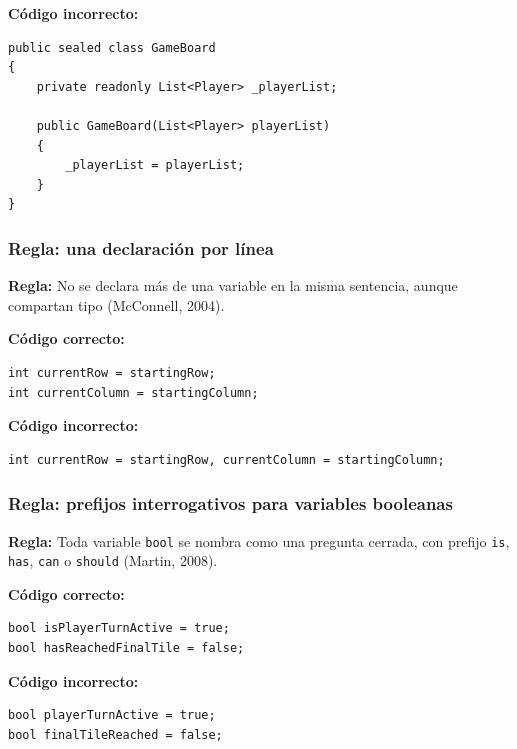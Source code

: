 \textbf{Código incorrecto:}
\begin{lstlisting}[style=csharpstyle]
public sealed class GameBoard
{
    private readonly List<Player> _playerList;

    public GameBoard(List<Player> playerList)
    {
        _playerList = playerList;
    }
}
\end{lstlisting}

\subsubsection{Regla: una declaración por línea}

\textbf{Regla:} No se declara más de una variable en la misma sentencia, aunque compartan tipo (McConnell, 2004).

\textbf{Código correcto:}
\begin{lstlisting}[style=csharpstyle]
int currentRow = startingRow;
int currentColumn = startingColumn;
\end{lstlisting}

\textbf{Código incorrecto:}
\begin{lstlisting}[style=csharpstyle]
int currentRow = startingRow, currentColumn = startingColumn;
\end{lstlisting}

\subsubsection{Regla: prefijos interrogativos para variables booleanas}

\textbf{Regla:} Toda variable \texttt{bool} se nombra como una pregunta cerrada, con prefijo \texttt{is}, \texttt{has}, \texttt{can} o \texttt{should} (Martin, 2008).

\textbf{Código correcto:}
\begin{lstlisting}[style=csharpstyle]
bool isPlayerTurnActive = true;
bool hasReachedFinalTile = false;
\end{lstlisting}

\textbf{Código incorrecto:}
\begin{lstlisting}[style=csharpstyle]
bool playerTurnActive = true;
bool finalTileReached = false;
\end{lstlisting}
